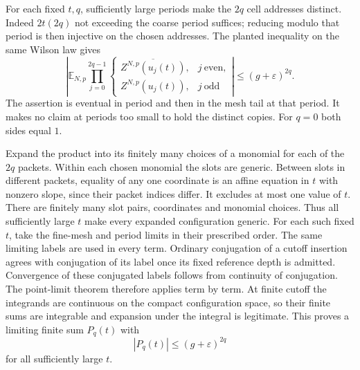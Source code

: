 For each fixed $t,q$, sufficiently large periods make the $2q$ cell
addresses distinct. Indeed $2t(2q)$ not exceeding the coarse period
suffices; reducing modulo that period is then injective on the chosen
addresses. The planted inequality on the same Wilson law gives
\begin{equation}\label{eq:episode-cutoff-power}
 \left|\mathbb E_{N,p}
       \prod_{j=0}^{2q-1}
       \begin{cases}
        \overline{Z^{N,p}(u_j(t))},&j\ \text{even},\\
        Z^{N,p}(u_j(t)),&j\ \text{odd}
       \end{cases}\right|
                    \leq(g+\varepsilon)^{2q}.
\end{equation}
The assertion is eventual in period and then in the mesh tail at that
period. It makes no claim at periods too small to hold the distinct
copies. For $q=0$ both sides equal $1$.

Expand the product into its finitely many choices of a monomial for
each of the $2q$ packets. Within each chosen monomial the slots are
generic. Between slots in different packets, equality of any one
coordinate is an affine equation in $t$ with nonzero slope, since their
packet indices differ. It excludes at most one value of $t$. There
are finitely many slot pairs, coordinates and monomial choices. Thus
all sufficiently large $t$ make every expanded configuration generic.
For each such fixed $t$, take the fine-mesh and period limits in their
prescribed order. The same limiting labels are used in every term.
Ordinary conjugation of a cutoff insertion agrees with conjugation of
its label once its fixed reference depth is admitted. Convergence of
these conjugated labels follows from continuity of conjugation.
The point-limit theorem therefore applies term by term. At finite
cutoff the integrands are continuous on the compact configuration
space, so their finite sums are integrable and expansion under the
integral is legitimate. This proves a limiting finite sum $P_q(t)$
with
\begin{equation}\label{eq:episode-first-limit}
                    |P_q(t)|\leq(g+\varepsilon)^{2q}
\end{equation}
for all sufficiently large $t$.

